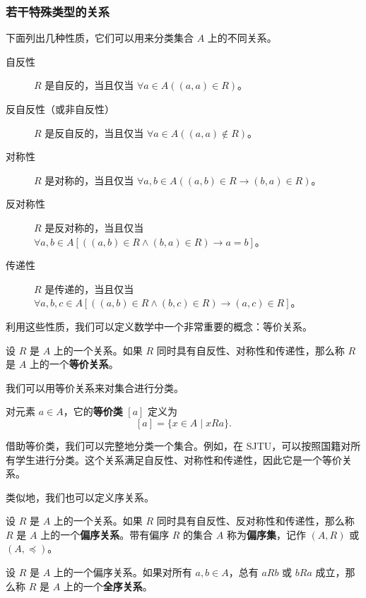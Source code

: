 \subsubsection{若干特殊类型的关系}

下面列出几种性质，它们可以用来分类集合 $A$ 上的不同关系。

\begin{description}
    \item[自反性] $R$ 是自反的，当且仅当 $\forall a\in A((a,a)\in R)$。
    \item[反自反性（或非自反性）] $R$ 是反自反的，当且仅当 $\forall a\in A((a,a)\notin R)$。
    \item[对称性] $R$ 是对称的，当且仅当 $\forall a,b\in A((a,b)\in R\to (b,a)\in R)$。
    \item[反对称性] $R$ 是反对称的，当且仅当 $\forall a,b\in A[((a,b)\in R\wedge (b,a)\in R)\to a=b]$。
    \item[传递性] $R$ 是传递的，当且仅当 $\forall a,b,c\in A[((a,b)\in R\wedge (b,c)\in R)\to (a,c)\in R]$。
\end{description}

利用这些性质，我们可以定义数学中一个非常重要的概念：等价关系。

\begin{definition}[等价关系]
设 $R$ 是 $A$ 上的一个关系。如果 $R$ 同时具有自反性、对称性和传递性，那么称 $R$ 是 $A$ 上的一个\textbf{等价关系}。
\end{definition}

我们可以用等价关系来对集合进行分类。

\begin{definition}[等价类]
对元素 $a\in A$，它的\textbf{等价类} $[a]$ 定义为
\[
[a]=\{x\in A\mid xRa\}.
\]
\end{definition}

借助等价类，我们可以完整地分类一个集合。例如，在 SJTU，可以按照国籍对所有学生进行分类。这个关系满足自反性、对称性和传递性，因此它是一个等价关系。

类似地，我们也可以定义序关系。

\begin{definition}[偏序]
设 $R$ 是 $A$ 上的一个关系。如果 $R$ 同时具有自反性、反对称性和传递性，那么称 $R$ 是 $A$ 上的一个\textbf{偏序关系}。带有偏序 $R$ 的集合 $A$ 称为\textbf{偏序集}，记作 $(A,R)$ 或 $(A,\preceq)$。
\end{definition}

\begin{definition}[全序/线性序]
设 $R$ 是 $A$ 上的一个偏序关系。如果对所有 $a,b\in A$，总有 $aRb$ 或 $bRa$ 成立，那么称 $R$ 是 $A$ 上的一个\textbf{全序关系}。
\end{definition}

